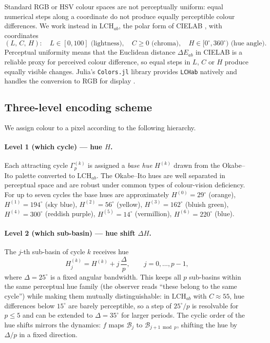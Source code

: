 \documentclass[12pt]{article}
\theoremstyle{definition}
\begin{document}
Standard RGB or HSV colour spaces are not perceptually uniform: equal numerical
steps along a coordinate do not produce equally perceptible colour differences.
We work instead in $\mathrm{LCH}_{ab}$, the polar form of CIELAB
\cite{Fairchild2013}, with coordinates
\[
  (L,\,C,\,H): \quad
  L\in[0,100] \text{ (lightness)},\quad
  C\geq 0 \text{ (chroma)},\quad
  H\in[0^\circ,360^\circ) \text{ (hue angle)}.
\]
Perceptual uniformity means that the Euclidean distance $\Delta E_{ab}$ in
CIELAB is a reliable proxy for perceived colour difference, so equal steps in
$L$, $C$ or $H$ produce equally visible changes.
Julia's \texttt{Colors.jl} library provides \texttt{LCHab} natively and handles
the conversion to RGB for display \cite{ColorsJl}.

\subsection{Three-level encoding scheme}

We assign colour to a pixel according to the following hierarchy.

\paragraph{Level 1 (which cycle) --- hue $H$.}
Each attracting cycle $\Gamma_p^{(k)}$ is assigned a \emph{base hue}
$H^{(k)}$ drawn from the Okabe--Ito palette \cite{OkabIto2008} converted to
$\mathrm{LCH}_{ab}$.  The Okabe--Ito hues are well separated in perceptual
space and are robust under common types of colour-vision deficiency.  For up
to seven cycles the base hues are approximately
$H^{(0)}=29^\circ$ (orange), $H^{(1)}=194^\circ$ (sky blue),
$H^{(2)}=56^\circ$ (yellow), $H^{(3)}=162^\circ$ (bluish green),
$H^{(4)}=300^\circ$ (reddish purple), $H^{(5)}=14^\circ$ (vermillion),
$H^{(6)}=220^\circ$ (blue).

\paragraph{Level 2 (which sub-basin) --- hue shift $\Delta H$.}
The $j$-th sub-basin of cycle $k$ receives hue
\[
  H^{(k)}_j = H^{(k)} + j\,\frac{\Delta}{p},
  \qquad j=0,\ldots,p-1,
\]
where $\Delta=25^\circ$ is a fixed angular bandwidth.  This keeps all
$p$ sub-basins within the same perceptual hue family (the observer reads
``these belong to the same cycle'') while making them mutually distinguishable:
in $\mathrm{LCH}_{ab}$ with $C\approx55$, hue differences below $15^\circ$ are
barely perceptible, so a step of $25^\circ/p$ is resolvable for $p\leq5$ and
can be extended to $\Delta=35^\circ$ for larger periods.
The cyclic order of the hue shifts mirrors the dynamics: $f$ maps
$\mathcal{B}_j$ to $\mathcal{B}_{j+1\bmod p}$, shifting the hue by
$\Delta/p$ in a fixed direction.
\end{document}
